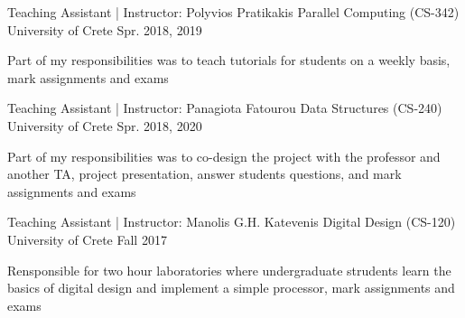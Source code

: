 \begin{cventries}
  \cventry
    {Teaching Assistant | Instructor: Polyvios Pratikakis} %
    {Parallel Computing (CS-342)} %
    {University of Crete} %
    {Spr. 2018, 2019} %
    {
      \begin{cvitems} %
        \item{Part of my responsibilities was to teach tutorials for
            students on a weekly basis, mark assignments and exams}
      \end{cvitems}
    }

  \cventry
    {Teaching Assistant | Instructor: Panagiota Fatourou} %
    {Data Structures (CS-240)} %
    {University of Crete} %
    {Spr. 2018, 2020} %
    {
      \begin{cvitems} %
        \item{Part of my responsibilities was to co-design the project
            with the professor and another TA, project presentation,
              answer students questions, and mark assignments and
              exams}
      \end{cvitems}
    }

  \cventry
    {Teaching Assistant | Instructor: Manolis G.H. Katevenis} %
    {Digital Design (CS-120)} %
    {University of Crete} %
    {Fall 2017} %
    {
      \begin{cvitems} %
        \item{Rensponsible for two hour laboratories where
            undergraduate strudents learn the basics of digital design
              and implement a simple processor, mark assignments and
              exams}
      \end{cvitems}
    }

\end{cventries}
